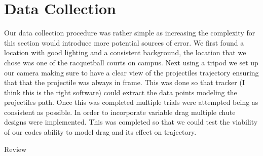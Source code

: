 \section{Data Collection}
	Our data collection procedure was rather simple as increasing the complexity for this section would introduce more potential sources of error. We first found a location with good lighting and a consistent background, the location that we chose was one of the racquetball courts on campus. 
	Next using a tripod we set up our camera making sure to have a clear view of the projectiles trajectory ensuring that that the projectile was always in frame. This was done so that tracker (I think this is the right software) could extract the data points modeling the projectiles path. Once this was completed multiple trials were attempted being as consistent as possible. 
	In order to incorporate variable drag multiple chute designs were implemented. This was completed so that we could test the viability of our codes ability to model drag and its effect on trajectory. 

\TODO Review